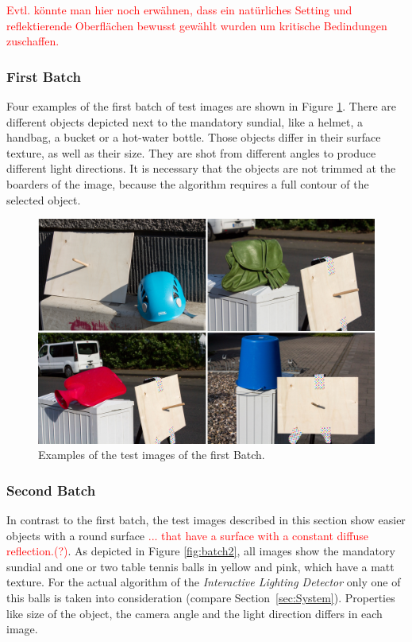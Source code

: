 \textcolor{red}{Evtl. könnte man hier noch erwähnen, dass ein natürliches Setting und reflektierende Oberflächen bewusst gewählt wurden um kritische Bedindungen zuschaffen.}
\subsubsection{First Batch} \label{sec:testimagesfirst}

Four examples of the first batch of test images are shown in Figure \ref{fig:batch1}. There are different objects depicted next to the mandatory sundial, like a helmet, a handbag, a bucket or a hot-water bottle. Those objects differ in their surface texture, as well as their size. They are shot from different angles to produce different light directions. It is necessary that the objects are not trimmed at the boarders of the image, because the algorithm requires a full contour of the selected object.


\begin{figure}[H] 
	\center 
	\includegraphics[width=12cm]{Images/batch1.jpg}			
	\caption[Examples of the test images of the first Batch.]{Examples of the test images of the first Batch.}
	\label{fig:batch1}
\end{figure}

\subsubsection{Second Batch} \label{sec:testimagessecond}

In contrast to the first batch, the test images described in this section show easier objects with a round surface \textcolor{red}{... that have a surface with a constant diffuse reflection.(?)}. As depicted in Figure \ref{fig:batch2}, all images show the mandatory sundial and one or two table tennis balls in yellow and pink, which have a matt texture. For the actual algorithm of the \textit{Interactive Lighting Detector} only one of this balls is taken into consideration (compare Section~\ref{sec:System}). Properties like size of the object, the camera angle and the light direction differs in each image.

